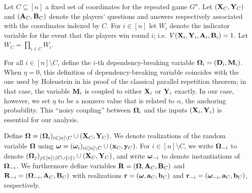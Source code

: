 Let $C \subseteq [n]$ a fixed set of coordinates for the repeated game $G^n$. %
Let $(\mathbf{X}_C,\mathbf{Y}_C)$ and $(\mathbf{A}_C,\mathbf{B}_C)$ denote the players' questions and answers respectively associated with the coordinates indexed by $C$. For $i \in [n]$ let $W_i$ denote the indicator variable for the event that the players win round $i$; i.e. $V(\mathbf{X}_i,\mathbf{Y}_i,\mathbf{A}_i,\mathbf{B}_i) = 1$. Let $W_C = \prod_{i \in C} W_i$. 

For all $i \in [n] \setminus C$, define the $i$-th dependency-breaking variable ${\boldsymbol{\Omega}}_i = (\mathbf{D}_i,\mathbf{M}_i)$. When $\eta = 0$, this definition of dependency-breaking variable coincides with the one used by Holenstein in his proof of the classical parallel repetition theorem; in that case, the variable $\mathbf{M}_i$ is coupled to either $\mathbf{X}_i$ or $\mathbf{Y}_i$ exactly. In our case, however, we set $\eta$ to be a nonzero value that is related to $\alpha$, the anchoring probability. This ``noisy coupling'' between ${\boldsymbol{\Omega}}_i$ and the inputs $(\mathbf{X}_i,\mathbf{Y}_i)$ is essential for our analysis. 




Define ${\boldsymbol{\Omega}} = ({\boldsymbol{\Omega}}_i)_{i \in [n] \setminus C} \cup (\mathbf{X}_C,\mathbf{Y}_C)$. We denote realizations of the random variable ${\boldsymbol{\Omega}}$ using ${\boldsymbol{\omega}} = ({\boldsymbol{\omega}}_i)_{i \in [n] \setminus C} \cup (\mathbf{x}_C,\mathbf{y}_C)$. For $i \in [n] \setminus C$, we write ${\boldsymbol{\Omega}}_{-i}$ to denote $({\boldsymbol{\Omega}}_j)_{j \in [n] \setminus (C \cup \{i\})} \cup (\mathbf{X}_C,\mathbf{Y}_C)$, and write ${\boldsymbol{\omega}}_{-i}$ to denote instantiations of ${\boldsymbol{\Omega}}_{-i}$. We furthermore define variables $\mathbf{R} = ({\boldsymbol{\Omega}},\mathbf{A}_C,\mathbf{B}_C)$ and $\mathbf{R}_{-i} = ({\boldsymbol{\Omega}}_{-i},\mathbf{A}_C,\mathbf{B}_C)$ with realizations $\mathbf{r} = ({\boldsymbol{\omega}},\mathbf{a}_C,\mathbf{b}_C)$ and $\mathbf{r}_{-i} = ({\boldsymbol{\omega}}_{-i},\mathbf{a}_C,\mathbf{b}_C)$, respectively.

%
%
% 

